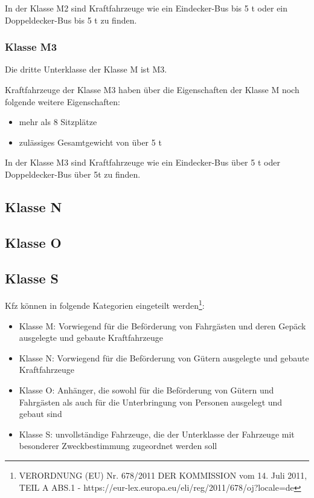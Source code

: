 In der Klasse M2 sind Kraftfahrzeuge wie ein Eindecker-Bus bis 5 \ac{t} oder ein Doppeldecker-Bus bis 5 \ac{t} zu finden.

\subsubsection{Klasse M3}

Die dritte Unterklasse der Klasse M ist M3.

Kraftfahrzeuge der Klasse M3 haben über die Eigenschaften der Klasse M noch folgende weitere Eigenschaften:
\begin{itemize}
	\item {mehr als 8 Sitzplätze}
	\item {zulässiges Gesamtgewicht von über 5 \ac{t}}
\end{itemize}

In der Klasse M3 sind Kraftfahrzeuge wie ein Eindecker-Bus über 5 \ac{t} oder Doppeldecker-Bus über 5\ac{t} zu finden.

\subsection{Klasse N}

\subsection{Klasse O}
\subsection{Klasse S}


\ac{Kfz} können in folgende Kategorien eingeteilt werden\footnote{VERORDNUNG (EU) Nr. 678/2011 DER KOMMISSION
	vom 14. Juli 2011, TEIL A ABS.1 - https://eur-lex.europa.eu/eli/reg/2011/678/oj?locale=de}:
\begin{itemize}
	\item Klasse M: Vorwiegend für die Beförderung von Fahrgästen und deren Gepäck ausgelegte und gebaute Kraftfahrzeuge
	\item Klasse N: Vorwiegend für die Beförderung von Gütern ausgelegte und gebaute Kraftfahrzeuge
	\item Klasse O: Anhänger, die sowohl für die Beförderung von Gütern und Fahrgästen als auch für die Unterbringung von Personen ausgelegt und gebaut sind
	\item Klasse S: unvollständige Fahrzeuge, die der Unterklasse der Fahrzeuge mit besonderer Zweckbestimmung zugeordnet werden soll
\end{itemize}



